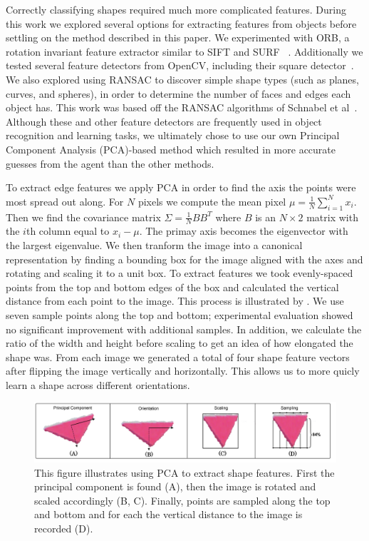 \documentclass[11pt]{article}
\begin{document}
Correctly classifying shapes required much more complicated features.
During this work we explored several options for extracting features from
objects before settling on the method described in this paper. We experimented
with ORB, a rotation invariant feature extractor similar to SIFT and SURF
~\cite{rublee2011orb}. Additionally we tested several feature detectors from
OpenCV, including their square detector~\cite{opencv_library}. We also explored
using RANSAC to discover simple shape types (such as planes, curves, and spheres),
in order to determine the number of faces and edges each object has. This work
was based off the RANSAC algorithms of Schnabel et
al~\cite{schnabel2007efficient}. Although these and other feature detectors are
frequently used in object recognition and learning tasks, we ultimately chose to
use our own Principal Component Analysis (PCA)-based method which resulted in
more accurate guesses from the agent than the other methods.

To extract edge features we apply PCA in order to find the axis the points were most spread out along.
For $N$ pixels we compute the mean pixel $\mu = \frac{1}{N}\displaystyle\sum_{i=1}^{N}x_i$. Then we find the covariance matrix $\Sigma = \frac{1}{N} BB^T$ where $B$ is an $N\times 2$ matrix with the $i$th column equal to $x_i - \mu$. The primay axis becomes the eigenvector with the largest eigenvalue. We then tranform the image into a canonical representation by finding a bounding box for the image aligned with the axes and rotating and scaling it to a unit box. To extract features we took evenly-spaced
points from the top and bottom edges of the box and calculated the vertical distance
from each point to the image. This process is illustrated by . We use seven
sample points along the top and bottom; experimental evaluation showed no significant
improvement with additional samples. In addition, we calculate the ratio of the width
and height before scaling to get an idea of how elongated the shape was. From each image we generated a total of four shape feature vectors after flipping the image vertically and horizontally. This allows us to more quicly learn a shape across different orientations.

\begin{figure}[h!]
\centering
    \includegraphics[width=1.0\textwidth]{figures/PCA_example.png}
    \caption{This figure illustrates using PCA to extract shape features. First the principal component is found (A), then the image is rotated and scaled accordingly (B, C). Finally, points are sampled along the top and bottom and for each the vertical distance to the image is recorded (D).}
    \label{fig:pca}
\end{figure}
\end{document}
